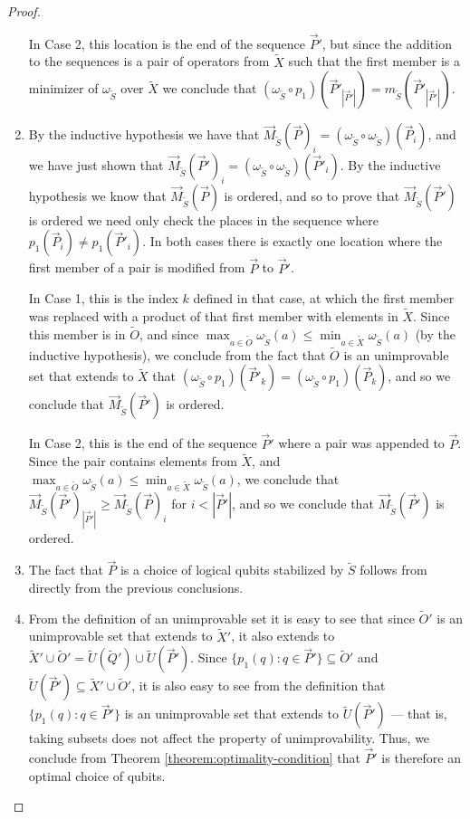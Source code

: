 \documentclass[12pt]{amsbook}
\theoremstyle{plain}
\theoremstyle{definition}
\theoremstyle{remark}
\newcommand{\lst}{\vec}
\newcommand{\set}{\tilde}
\newcommand{\om}{\omega}
\begin{document}
\begin{proof}
\begin{enumerate}
In Case 2, this location is the end of the sequence $\lst P'$, but since the addition to the sequences is a pair of operators from $\set X$ such that the first member is a minimizer of $\om_{\set S}$ over $\set X$ we conclude that $(\om_{\set S}\circ p_1)(\lst P'_{|\lst P'|})=m_{\set S}(\lst P'_{|\lst P'|})$.
\item

By the inductive hypothesis we have that $\lst M_{\set S}(\lst P)_i=(\om_{\set S}\circ \om_{\set S})(\lst P_i)$, and we have just shown that $\lst M_{\set S}(\lst P')_i=(\om_{\set S}\circ \om_{\set S})(\lst P'_i)$.  By the inductive hypothesis we know that $\lst M_{\set S}(\lst P)$ is ordered, and so to prove that $\lst M_{\set S}(\lst P')$ is ordered we need only check the places in the sequence where $p_1(\lst P_i)\ne p_1(\lst P'_i)$.  In both cases there is exactly one location where the first member of a pair is modified from $\lst P$ to $\lst P'$.

In Case 1, this is the index $k$ defined in that case, at which the first member was replaced with a product of that first member with elements in $\set X$.  Since this member is in $\set O$, and since $\max_{a\in\set O}\om_{\set S}(a)\le\min_{a\in\set X}\om_{\set S}(a)$ (by the inductive hypothesis), we conclude from the fact that $\set O$ is an unimprovable set that extends to $\set X$ that $(\om_{\set S}\circ p_1)(\lst P'_k)=(\om_{\set S}\circ p_1)(\lst P_k)$, and so we conclude that $\lst M_{\set S}(\lst P')$ is ordered.

In Case 2, this is the end of the sequence $\lst P'$ where a pair was appended to $\lst P$.  Since the pair contains elements from $\set X$, and $\max_{a\in\set O}\om_{\set S}(a)\le\min_{a\in\set X}\om_{\set S}(a)$, we conclude that $\lst M_{\set S}(\lst P')_{|\lst P'|}\ge\lst M_{\set S}(\lst P)_i$ for $i<|\lst P'|$, and so we conclude that $\lst M_{\set S}(\lst P')$ is ordered.
\item

The fact that $\lst P$ is a choice of logical qubits stabilized by $\set S$ follows from directly from the previous conclusions.
\item

From the definition of an unimprovable set it is easy to see that since $\set O'$ is an unimprovable set that extends to $\set X'$, it also extends to $\set X'\cup\set O'=\set U(\set Q')\cup\set U(\lst P')$.  Since $\{p_1(q):q\in\lst P'\}\subseteq \set O'$ and $\set U(\lst P')\subseteq \set X'\cup\set O'$, it is also easy to see from the definition that $\{p_1(q):q\in\lst P'\}$ is an unimprovable set that extends to $\set U(\lst P')$ --- that is, taking subsets does not affect the property of unimprovability.  Thus, we conclude from Theorem \ref{theorem:optimality-condition} that $\lst P'$ is therefore an optimal choice of qubits.
\end{enumerate}
\end{proof}
\end{document}
